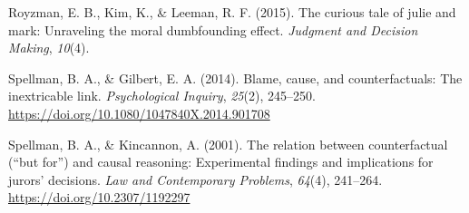 \documentclass[
  man,floatsintext]{apa6}
\newlength{\cslhangindent}
\newlength{\cslentryspacingunit} %
\newenvironment{CSLReferences}[2] %
 {%
  \setlength{\parindent}{0pt}
  \ifodd #1
  \let\oldpar\par
  \def\par{\hangindent=\cslhangindent\oldpar}
  \fi
  \setlength{\parskip}{#2\cslentryspacingunit}
 }%
 {}
\begin{document}
\begin{CSLReferences}{1}{0}
\leavevmode{}%
Royzman, E. B., Kim, K., \& Leeman, R. F. (2015). The curious tale of julie and mark: Unraveling the moral dumbfounding effect. \emph{Judgment and Decision Making}, \emph{10}(4).

\leavevmode{}%
Spellman, B. A., \& Gilbert, E. A. (2014). Blame, cause, and counterfactuals: The inextricable link. \emph{Psychological Inquiry}, \emph{25}(2), 245--250. \url{https://doi.org/10.1080/1047840X.2014.901708}

\leavevmode{}%
Spellman, B. A., \& Kincannon, A. (2001). The relation between counterfactual ({``but for''}) and causal reasoning: Experimental findings and implications for jurors' decisions. \emph{Law and Contemporary Problems}, \emph{64}(4), 241--264. \url{https://doi.org/10.2307/1192297}

\end{CSLReferences}
\end{document}
